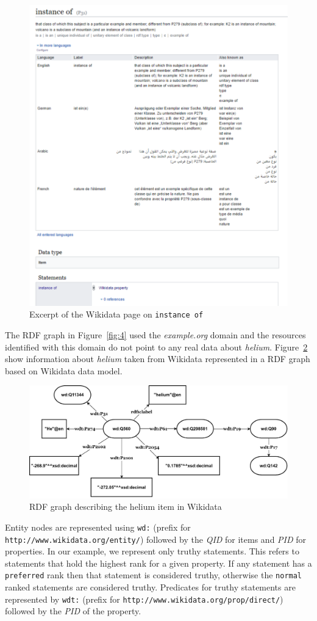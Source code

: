 \begin{figure}[h]
  \centering
  \includegraphics[width=0.75 \linewidth]{images/instance_of.pdf}
  \caption{Excerpt of the Wikidata page on \texttt{instance of}}
  \label{fig:6}
\end{figure}


The RDF graph in Figure~\ref{fig:4} used the \textit{example.org} domain and the resources identified with this domain do not point to any real data about \textit{helium}. Figure~\ref{fig:7} show information about \textit{helium} taken from Wikidata represented in a RDF graph based on Wikidata data model. 


\begin{figure}[h]
  \centering
  \includegraphics[width=0.75 \linewidth]{images/wikidata_graph.drawio.pdf}
  \caption{RDF graph describing the helium item in Wikidata}
  \label{fig:7}
\end{figure}

Entity nodes are represented using \texttt{wd:} (prefix for \texttt{http://www.wikidata.org/entity/}) followed by the \textit{QID} for items and \textit{PID} for properties. In our example, we represent only truthy statements. This refers to statements that hold the highest rank for a given property. If any statement has a \texttt{preferred} rank then that statement is considered truthy, otherwise the \texttt{normal} ranked statements are considered truthy. Predicates for truthy statements are represented by \texttt{wdt:} (prefix for \texttt{http://www.wikidata.org/prop/direct/}) followed by the \textit{PID} of the property. 

